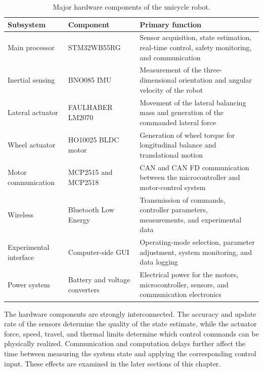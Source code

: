 \begin{table}[htbp]
  \centering
  \small
  \renewcommand{\arraystretch}{1.3}
  \caption{Major hardware components of the unicycle robot.}
  \label{tab:hardware-components}
  \begin{tabular}{
    p{}
    p{}
    p{}
  }
    \hline
    \textbf{Subsystem}
    &
    \textbf{Component}
    &
    \textbf{Primary function}
    \\
    \hline

    Main processor
    &
    STM32WB55RG
    &
    Sensor acquisition, state estimation, real-time control, safety monitoring, and communication
    \\

    Inertial sensing
    &
    BNO085 IMU
    &
    Measurement of the three-dimensional orientation and angular velocity of the robot
    \\

    Lateral actuator
    &
    FAULHABER LM2070
    &
    Movement of the lateral balancing mass and generation of the commanded lateral force
    \\

    Wheel actuator
    &
    HO10025 BLDC motor
    &
    Generation of wheel torque for longitudinal balance and translational motion
    \\

    Motor communication
    &
    MCP2515 and MCP2518
    &
    CAN and CAN FD communication between the microcontroller and motor-control system
    \\

    Wireless
    &
    Bluetooth Low Energy
    &
    Transmission of commands, controller parameters, measurements, and experimental data
    \\

    Experimental interface
    &
    Computer-side GUI
    &
    Operating-mode selection, parameter adjustment, system monitoring, and data logging
    \\

    Power system
    &
    Battery and voltage converters
    &
    Electrical power for the motors, microcontroller, sensors, and communication electronics
    \\

    \hline
  \end{tabular}
\end{table}

The hardware components are strongly interconnected. The accuracy and update rate of the sensors determine the quality of the state estimate, while the actuator force, speed, travel, and thermal limits determine which control commands can be physically realized. Communication and computation delays further affect the time between measuring the system state and applying the corresponding control input. These effects are examined in the later sections of this chapter.


